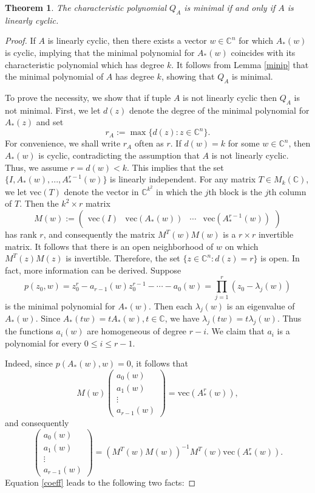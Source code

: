 \documentclass[10pt,a4paper]{amsart}
\newtheorem{theorem}{Theorem}
\newcommand{\C}{{\mathbb C}}
\begin{document}
\begin{theorem}\label{lcyclic}
The characteristic polynomial $Q_A$ is minimal if and only if $A$ is linearly cyclic.
\end{theorem}

\begin{proof}
If $A$ is linearly cyclic, then there exists a vector $w\in \C^n$ for which $A_*(w)$ is cyclic, implying that the minimal polynomial for $A_*(w)$ coincides with its characteristic polynomial which has degree $k$. It follows from Lemma \ref{minip} that the minimal polynomial of $A$ has degree $k$, showing that $Q_A$ is minimal.

To prove the necessity, we show that if tuple $A$ is not linearly cyclic then $Q_A$ is not minimal.
First, we let $d(z)$ denote the degree of the minimal polynomial for $A_*(z)$ and set \[r_A:=\max \{d(z): z\in \C^n\}.\] For convenience, we shall write $r_A$ often as $r$. If $d(w)=k$ for some $w\in \C^n$, then $A_*(w)$ is cyclic, contradicting the assumption that $A$ is not linearly cyclic. Thus, we assume $r=d(w)<k$. This implies that the set $\{I, A_*(w), ..., A^{r-1}_*(w)\}$ is linearly independent. For any matrix $T\in M_k(\C)$, we let vec$(T)$ denote the vector in $\C^{k^2}$ in which the $j$th block is the $j$th column of $T$. Then the $k^2\times r$ matrix 
\[M(w):=\begin{pmatrix} \text{vec}(I) & \text{vec}(A_*(w)) & \cdots & \text{vec}(A^{r-1}_*(w))\end{pmatrix}\] has rank $r$, and consequently the matrix $M^T(w)M(w)$ is a $r\times r$ invertible matrix. It follows that there is an open neighborhood of $w$ on which $M^T(z)M(z)$ is invertible. Therefore, the set $\{z\in \C^n: d(z)=r\}$ is open. In fact, more information can be derived. Suppose 
\[p(z_0,w)=z_0^r-a_{r-1}(w)z_0^{r-1}-\cdots -a_0(w)=\prod_{j=1}^r(z_0-\lambda_j(w))\] is the minimal polynomial for $A_*(w)$. Then each $\lambda_j(w)$ is an eigenvalue of $A_*(w)$. Since $A_*(tw)=tA_*(w), t\in \C$, we have $\lambda_j(tw)=t\lambda_j(w)$. Thus the functions $a_i(w)$ are homogeneous of degree $r-i$. We claim that $a_i$ is a polynomial for every $0\leq i\leq r-1$. 

Indeed, since $p(A_*(w),w)=0$, it follows that
\[M(w)\begin{pmatrix} a_0(w)\\ a_1(w) \\ \vdots \\a_{r-1}(w)\end{pmatrix}=\text{vec}(A^{r}_*(w)),\] and consequently
\begin{equation}\label{coeff}
\begin{pmatrix} a_0(w)\\ a_1(w) \\ \vdots \\a_{r-1}(w)\end{pmatrix}=\left(M^T(w)M(w)\right)^{-1}M^T(w)\text{vec}(A^r_*(w)).
\end{equation}
Equation \eqref{coeff} leads to the following two facts:


\end{proof}
\end{document}
